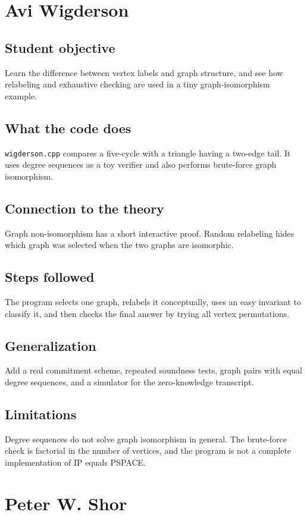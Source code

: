 \documentclass[11pt]{book}
\begin{document}
\chapter{Avi Wigderson}
\section{Student objective}
Learn the difference between vertex labels and graph structure, and see how relabeling and exhaustive checking are used in a tiny graph-isomorphism example.
\section{What the code does}
\texttt{wigderson.cpp} compares a five-cycle with a triangle having a two-edge tail. It uses degree sequences as a toy verifier and also performs brute-force graph isomorphism.

\section{Connection to the theory}
Graph non-isomorphism has a short interactive proof. Random relabeling hides which graph was selected when the two graphs are isomorphic.

\section{Steps followed}
The program selects one graph, relabels it conceptually, uses an easy invariant to classify it, and then checks the final answer by trying all vertex permutations.

\section{Generalization}
Add a real commitment scheme, repeated soundness tests, graph pairs with equal degree sequences, and a simulator for the zero-knowledge transcript.

\section{Limitations}
Degree sequences do not solve graph isomorphism in general. The brute-force check is factorial in the number of vertices, and the program is not a complete implementation of IP equals PSPACE.

\chapter{Peter W. Shor}
\end{document}
